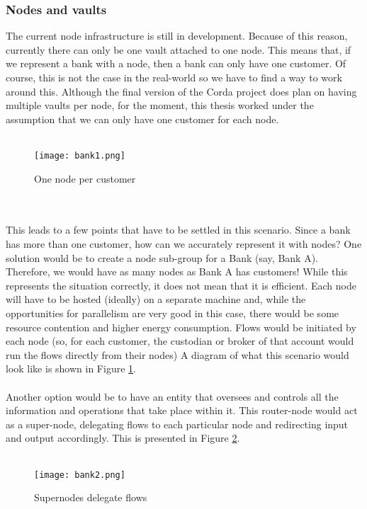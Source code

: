 \documentclass[12pt,twoside]{article}
\begin{document}
\subsubsection{Nodes and vaults}
\label{vaultnode}
The current node infrastructure is still in development. Because of this reason, currently there can only be one vault attached to one node. This means that, if we represent a bank with a node, then a bank can only have one customer. Of course, this is not the case in the real-world so we have to find a way to work around this. Although the final version of the Corda project does plan on having multiple vaults per node, for the moment, this thesis worked under the assumption that we can only have one customer for each node.
\\ \\
\begin{figure}[!htb]
\centering
\texttt{[image: bank1.png]}
\caption{One node per customer}
\centering
\label{fig:bank1}
\end{figure}
\\ \\
This leads to a few points that have to be settled in this scenario. Since a bank has more than one customer, how can we accurately represent it with nodes? One solution would be to create a node sub-group for a Bank (say, Bank A). Therefore, we would have as many nodes as Bank A has customers! While this represents the situation correctly, it does not mean that it is efficient. Each node will have to be hosted (ideally) on a separate machine and, while the opportunities for parallelism are very good in this case, there would be some resource contention and higher energy consumption. Flows would be initiated by each node (so, for each customer, the custodian or broker of that account would run the flows directly from their nodes) A diagram of what this scenario would look like is shown in Figure \ref{fig:bank1}.
\\ \\
Another option would be to have an entity that oversees and controls all the information and operations that take place within it. This router-node would act as a super-node, delegating flows to each particular node and redirecting input and output accordingly. This is presented in Figure \ref{fig:bank2}. 
\\ \\
\begin{figure}[!htb]
\centering
\texttt{[image: bank2.png]}
\caption{Supernodes delegate flows}
\centering
\label{fig:bank2}
\end{figure}
\end{document}
